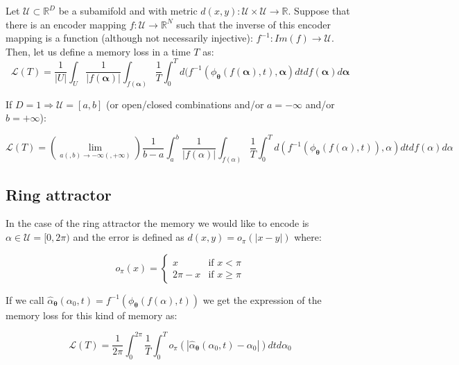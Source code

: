 \documentclass{article} %
\newcounter{ct}
\theoremstyle{definition}
\theoremstyle{remark}
\begin{document}
Let $\mathcal{U}\subset \mathbb{R}^D$ be a subamifold and  with metric $d(x,y): \mathcal{U} \times \mathcal{U} \rightarrow \mathbb{R}$.
Suppose that there is an encoder mapping $f: \mathcal{U} \rightarrow \mathbb{R}^N$ such that the inverse of this encoder mapping is a function (although not necessarily injective): $f^{-1}: Im(f) \rightarrow \mathcal{U}$. 
Then, let us define a memory loss in a time $T$ as:
\begin{equation}
    \mathcal{L}(T) = \frac{1}{|U|} \int_U  \frac{1}{|f(\bm{\alpha})|} \int_{f(\bm{\alpha})} \frac{1}{T} \int_0^T d(f^{-1}(\phi_{\bm{\theta}}(f(\bm{\alpha}),t),\bm{\alpha}) dt df(\bm{\alpha}) d\bm{\alpha}
\end{equation}

If $D = 1 \Rightarrow \mathcal{U} = [a,b]$ (or open/closed combinations and/or $a = -\infty$ and/or $b = +\infty$):

\begin{equation}
    \mathcal{L}(T) = \left(\lim_{a(,b) \rightarrow -\infty(,+\infty)}\right) \frac{1}{b - a} \int_a^b  \frac{1}{|f(\alpha)|} \int_{f(\alpha)} \frac{1}{T} \int_0^T d(f^{-1}(\phi_{\bm{\theta}}(f(\alpha),t)),\alpha) dt df(\alpha) d\alpha
\end{equation}

\subsection{Ring attractor}

In the case of the ring attractor the memory we would like to encode is $\alpha \in \mathcal{U} = [0,2 \pi)$ and the error is defined as $d(x,y) = o_\pi(|x-y|)$ where:

\begin{equation}
    o_\pi(x) = \begin{cases}
    x & \text{if } x < \pi \\
    2 \pi - x & \text{if } x \geq \pi
    \end{cases}
\end{equation}

If we call $\hat{\alpha}_{\boldsymbol{\theta}}(\alpha_0, t) = f^{-1}(\phi_{\bm{\theta}}(f(\alpha),t))$ we get the expression of the memory loss for this kind of memory as:

\begin{equation}
    \mathcal{L}(T) =  \frac{1}{2 \pi} \int_0^{2 \pi}  \frac{1}{T} \int_0^T o_\pi \left( \left| \hat{\alpha}_{\boldsymbol{\theta}}(\alpha_0, t) - \alpha_0  \right| \right) dt d\alpha_0
\end{equation}
\end{document}
